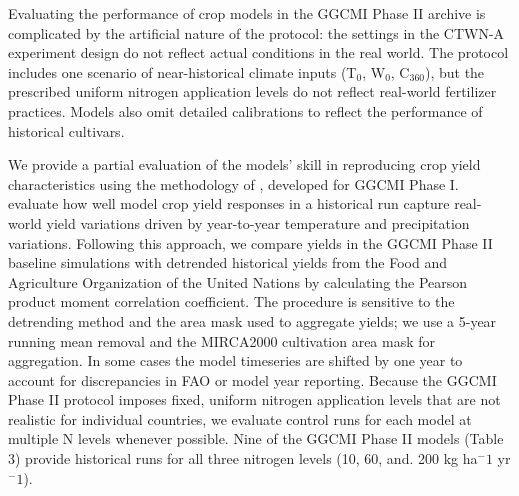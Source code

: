 \documentclass[gmd, manuscript]{copernicus} %
\begin{document}
Evaluating the performance of crop models in the GGCMI Phase II archive is complicated by the artificial nature of the protocol: the settings in the CTWN-A experiment design do not reflect actual conditions in the real world. 
The protocol includes one scenario of near-historical climate inputs (T$_0$, W$_0$, C$_{360}$), but the prescribed uniform nitrogen application levels do not reflect real-world fertilizer practices. Models also omit detailed calibrations to reflect the performance of historical cultivars. 

We provide a partial evaluation of the models’ skill in reproducing crop yield characteristics using the methodology of \citet{muller_global_2017}, developed for GGCMI Phase I.
\citet{muller_global_2017} evaluate how well model crop yield responses in a historical run capture real-world yield variations driven by year-to-year temperature and precipitation variations. 
Following this approach, we compare yields in the GGCMI Phase II baseline simulations with detrended historical yields from the Food and Agriculture Organization of the United Nations \citep{FAOSTAT} by calculating the Pearson product moment correlation coefficient. 
The procedure is sensitive to the detrending method and the area mask used to aggregate yields; we use a 5-year running mean removal and the MIRCA2000 cultivation area mask for aggregation. 
In some cases the model timeseries are shifted by one year to account for discrepancies in FAO or model year reporting. 
Because the GGCMI Phase II protocol imposes fixed, uniform nitrogen application levels that are not realistic for individual countries, we evaluate control runs for each model at multiple N levels whenever possible. 
Nine of the GGCMI Phase II models (Table 3) provide historical runs for all three nitrogen levels (10, 60, and. 200 kg ha$^-1$ yr$^-1$).

\end{document}
